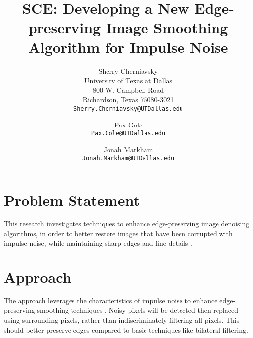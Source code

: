 \documentclass[10pt,twocolumn,letterpaper]{article}
\begin{document}
    \title{SCE: Developing a New Edge-preserving Image Smoothing Algorithm for Impulse Noise}

    \author{Sherry Cherniavsky\\
    University of Texas at Dallas\\
    800 W. Campbell Road\\
    Richardson, Texas 75080-3021\\
    {\tt\small Sherry.Cherniavsky@UTDallas.edu}
    \and
    Pax Gole\\
    {\tt\small Pax.Gole@UTDallas.edu}
    \and
    Jonah Markham\\
    {\tt\small Jonah.Markham@UTDallas.edu}
    }
    \maketitle


    \section{Problem Statement}
    This research investigates techniques to enhance edge-preserving image
    denoising algorithms, in order to better restore images that have been
    corrupted with impulse noise, while maintaining sharp edges and fine details \cite{chan2005, huang2021, chan2005-2, zhang2015}.

    \section{Approach}
    The approach leverages the characteristics of impulse noise to enhance
    edge-preserving smoothing techniques \cite{nikolova2004, abreu1996}. Noisy pixels will be detected then
    replaced using surrounding pixels, rather than indiscriminately filtering
    all pixels. This should better preserve edges compared to basic techniques
    like bilateral filtering.
\end{document}

